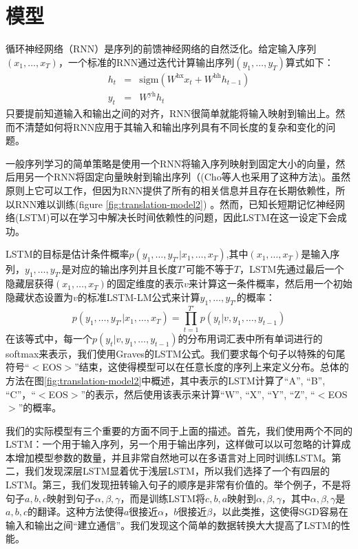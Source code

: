 
\section{模型}
\label{sec:model}

循环神经网络（RNN）\cite{werbos,rumelhart1986learning}是序列的前馈神经网络的自然泛化。给定输入序列$(x_1,\ldots,x_T)$，一个标准的RNN通过迭代计算输出序列$(y_1,\ldots,y_T)$算式如下：
\begin{eqnarray*}
	h_t &=& \mathrm{sigm}\left(W^{\mathrm{hx}} x_t + W^{\mathrm{hh}} h_{t-1}\right) \\
	y_t &=& W^{\mathrm{yh}}h_t
\end{eqnarray*}
只要提前知道输入和输出之间的对齐，RNN很简单就能将输入映射到输出上。然而不清楚如何将RNN应用于其输入和输出序列具有不同长度的复杂和变化的问题。

一般序列学习的简单策略是使用一个RNN将输入序列映射到固定大小的向量，然后用另一个RNN将固定向量映射到输出序列（(Cho等人\cite{cho14}也采用了这种方法)。虽然原则上它可以工作，但因为RNN提供了所有的相关信息并且存在长期依赖性，所以RNN难以训练(figure \ref{fig:translation-model2})
\cite{hochreiter_long_term,bengio_long_term,hochreiter97,Hochreiter01gradientflow}。然而，已知长短期记忆神经网络(LSTM)\cite{hochreiter97}可以在学习中解决长时间依赖性的问题，因此LSTM在这一设定下会成功。

LSTM的目标是估计条件概率$p(y_1,\ldots,y_{T'} | x_1,\ldots,x_T)$,其中$(x_1,\ldots,x_T)$是输入序列，$y_1,\ldots,y_{T'}$是对应的输出序列并且长度$T'$可能不等于$T$，LSTM先通过最后一个隐藏层获得$(x_1,\ldots,x_T)$的固定维度的表示$v$来计算这一条件概率，然后用一个初始隐藏状态设置为$v$的标准LSTM-LM公式来计算$y_1,\ldots,y_{T'}$的概率：
\begin{equation}
p(y_1,\ldots,y_{T'} | x_1,\ldots,x_T) = \prod_{t=1}^{T'} p(y_t | v, y_1, \ldots, y_{t-1})
\label{eqn:keyequation}
\end{equation}
在该等式中，每一个$p(y_t | v, y_1, \ldots, y_{t-1})$的分布用词汇表中所有单词进行的softmax来表示，我们使用Graves的LSTM公式\cite{graves13c}。我们要求每个句子以特殊的句尾符号``$<$EOS$>$''结束，这使得模型可以在任意长度的序列上来定义分布。总体的方法在图\ref{fig:translation-model2}中概述，其中表示的LSTM计算了``A'', ``B'', ``C''，``$<$EOS$>$''的表示，然后使用该表示来计算``W'',
``X'', ``Y'', ``Z'', ``$<$EOS$>$''的概率。

我们的实际模型有三个重要的方面不同于上面的描述。首先，我们使用两个不同的LSTM：一个用于输入序列，另一个用于输出序列，这样做可以以可忽略的计算成本增加模型参数的数量，并且非常自然地可以在多语言对上同时训练LSTM\cite{kal13}。第二，我们发现深层LSTM显着优于浅层LSTM，所以我们选择了一个有四层的LSTM。第三，我们发现扭转输入句子的顺序是非常有价值的。举个例子，不是将句子$a,b,c$映射到句子$\alpha,\beta,\gamma$，而是训练LSTM将$c,b,a$映射到$\alpha,\beta,\gamma$，其中$\alpha,\beta,\gamma$是$a,b,c$的翻译。这种方法使得$a$很接近$\alpha$，$b$很接近$\beta$，以此类推，这使得SGD容易在输入和输出之间“建立通信”。我们发现这个简单的数据转换大大提高了LSTM的性能。

